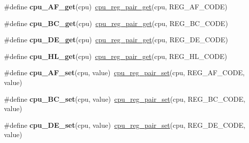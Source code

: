 \begin{DoxyCompactItemize}
\item 
\mbox{\label{cpu-registers_8h_ab4b9587b94920d448a1eb0700f4e4efb}} 
\#define {\bfseries cpu\+\_\+\+A\+F\+\_\+get}(cpu)~\hyperlink{cpu-registers_8h_a259712cddf80a16395900832af372953}{cpu\+\_\+reg\+\_\+pair\+\_\+get}(cpu, R\+E\+G\+\_\+\+A\+F\+\_\+\+C\+O\+DE)
\item 
\mbox{\label{cpu-registers_8h_a8226adc4ff6ccd7c3aaa5a22dee3c07c}} 
\#define {\bfseries cpu\+\_\+\+B\+C\+\_\+get}(cpu)~\hyperlink{cpu-registers_8h_a259712cddf80a16395900832af372953}{cpu\+\_\+reg\+\_\+pair\+\_\+get}(cpu, R\+E\+G\+\_\+\+B\+C\+\_\+\+C\+O\+DE)
\item 
\mbox{\label{cpu-registers_8h_a70499b334dcd9fa49688fbf527d84e53}} 
\#define {\bfseries cpu\+\_\+\+D\+E\+\_\+get}(cpu)~\hyperlink{cpu-registers_8h_a259712cddf80a16395900832af372953}{cpu\+\_\+reg\+\_\+pair\+\_\+get}(cpu, R\+E\+G\+\_\+\+D\+E\+\_\+\+C\+O\+DE)
\item 
\mbox{\label{cpu-registers_8h_a2f765933abb0b9e3a0a13e8c5762cbad}} 
\#define {\bfseries cpu\+\_\+\+H\+L\+\_\+get}(cpu)~\hyperlink{cpu-registers_8h_a259712cddf80a16395900832af372953}{cpu\+\_\+reg\+\_\+pair\+\_\+get}(cpu, R\+E\+G\+\_\+\+H\+L\+\_\+\+C\+O\+DE)
\item 
\mbox{\label{cpu-registers_8h_ae63583df0e36f561fa84b7642e47bc90}} 
\#define {\bfseries cpu\+\_\+\+A\+F\+\_\+set}(cpu,  value)~\hyperlink{cpu-registers_8h_aa7482c91cfc29f6a4a1ba62127f6ea35}{cpu\+\_\+reg\+\_\+pair\+\_\+set}(cpu, R\+E\+G\+\_\+\+A\+F\+\_\+\+C\+O\+DE, value)
\item 
\mbox{\label{cpu-registers_8h_aa22bb78466784134b76625d99b3caf28}} 
\#define {\bfseries cpu\+\_\+\+B\+C\+\_\+set}(cpu,  value)~\hyperlink{cpu-registers_8h_aa7482c91cfc29f6a4a1ba62127f6ea35}{cpu\+\_\+reg\+\_\+pair\+\_\+set}(cpu, R\+E\+G\+\_\+\+B\+C\+\_\+\+C\+O\+DE, value)
\item 
\mbox{\label{cpu-registers_8h_ac5a28382dd202886f7bfe5f7fe7d57f1}} 
\#define {\bfseries cpu\+\_\+\+D\+E\+\_\+set}(cpu,  value)~\hyperlink{cpu-registers_8h_aa7482c91cfc29f6a4a1ba62127f6ea35}{cpu\+\_\+reg\+\_\+pair\+\_\+set}(cpu, R\+E\+G\+\_\+\+D\+E\+\_\+\+C\+O\+DE, value)

\end{DoxyCompactItemize}
